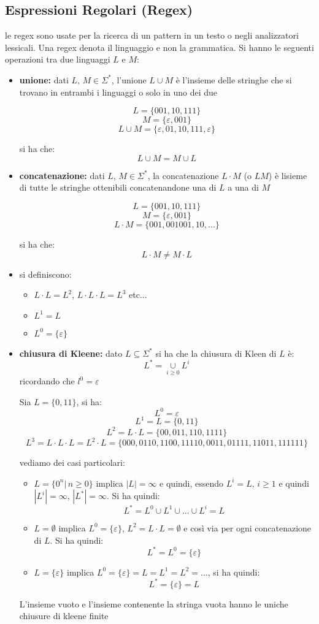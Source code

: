 \documentclass[a4paper,12pt, oneside]{book}
\begin{document}
\subsection{Espressioni Regolari (Regex)}
le regex sono usate per la ricerca di un pattern in un testo o negli analizzatori lessicali. Una regex denota il linguaggio e non la grammatica. Si hanno le seguenti operazioni tra due linguaggi $L$ e $M$:
\begin{itemize}
\item \textbf{unione:} dati $L,\, M\in \Sigma^*$, l'unione $L\cup M$ è l'insieme delle stringhe che si trovano in entrambi i linguaggi o solo in uno dei due
\begin{esempio}
$$L=\{001,10,111\}$$
$$M=\{\varepsilon,001\}$$
$$L\cup M=\{\varepsilon,01,10,111,\varepsilon\}$$
\end{esempio}
si ha che:
$$L\cup M=M\cup L$$
\item \textbf{concatenazione:} dati $L,\, M\in \Sigma^*$, la concatenazione $L\cdot M$ (o $LM$) è lisieme di tutte le stringhe ottenibili concatenandone una di $L$ a una di $M$
\begin{esempio}
$$L=\{001,10,111\}$$
$$M=\{\varepsilon,001\}$$
$$L\cdot M=\{001,001001,10,...\}$$
\end{esempio}
si ha che:
$$L\cdot M\neq M\cdot L$$
\item si definiscono:
\begin{itemize}
\item $L\cdot L=L^2$, $L\cdot L\cdot L=L^3$ etc...
\item $L^1=L$
\item $L^0=\{\varepsilon\}$
\end{itemize}
\item \textbf{chiusura di Kleene:} dato $L\subseteq \Sigma^*$ si ha che la chiusura di Kleen di $L$ è:
$$L^*=\underset{i\geq 0}{\cup}L^i$$
ricordando che $l^0=\varepsilon$
\begin{esempio}
Sia $L=\{0,11\}$, si ha:
$$L^0=\varepsilon$$
$$L^1=L=\{0,11\}$$
$$L^2=L\cdot L=\{00,011,110,1111\}$$
$$L^3=L\cdot L\cdot L=L^2\cdot L=\{000,0110,1100,11110,0011,01111,11011,111111\}$$
\end{esempio}
vediamo dei casi particolari:
\begin{itemize}
\item $L=\{0^n|\,n\geq 0\}$ implica $|L|=\infty$ e quindi, essendo $L^i=L,\, i\geq 1$ e quindi $|L^i|=\infty$, $|L^*|=\infty$. Si ha quindi:
$$L^*=L^0\cup L^1\cup ... \cup L^i=L$$
\item $L=\emptyset$ implica $L^0=\{\varepsilon\}$, $L^2=L\cdot L=\emptyset$ e così via per ogni concatenazione di $L$. Si ha quindi:
$$L^*=L^0=\{\varepsilon\}$$
\item $L=\{\varepsilon\}$ implica $L^0=\{\varepsilon\}=L=L^1=L^2=...$, si ha quindi:
$$L^*=\{\varepsilon\}=L$$
\end{itemize}
L'insieme vuoto e l'insieme contenente la stringa vuota hanno le uniche chiusure di kleene finite
\end{itemize}
\end{document}

